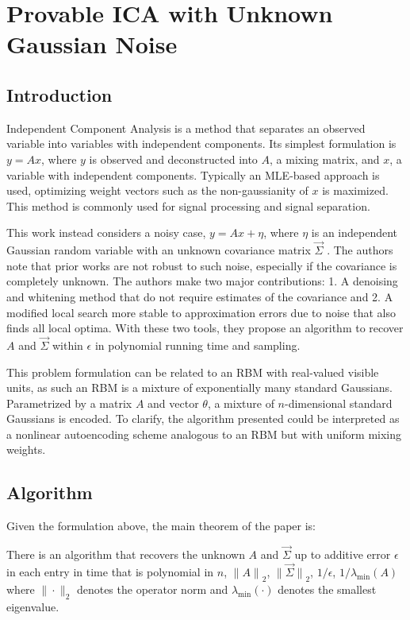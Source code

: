 
\section{Provable ICA with Unknown Gaussian Noise}

\subsection{Introduction}

Independent Component Analysis is a method that separates an observed
variable into variables with independent components. Its simplest
formulation is $y = Ax$, where $y$ is observed and deconstructed into
$A$, a mixing matrix, and $x$, a variable with independent
components. Typically an MLE-based approach is used, optimizing
weight vectors such as the non-gaussianity of $x$ is maximized. This
method is commonly used for signal processing and signal separation.

This work instead considers a noisy case, $y = Ax + \eta$, where
$\eta$ is an independent Gaussian random variable with an unknown
covariance matrix $\vec{\Sigma}$ \cite{arora2012provable}. The
authors note that prior works are not robust to such noise,
especially if the covariance is completely unknown. The authors make
two major contributions: 1. A denoising and whitening method that do
not require estimates of the covariance and 2. A modified local
search more stable to approximation errors due to noise that also
finds all local optima. With these two tools, they propose an
algorithm to recover $A$ and $\vec{\Sigma}$ within $\epsilon$ in
polynomial running time and sampling.

This problem formulation can be related to an RBM with real-valued
visible units, as such an RBM is a mixture of exponentially many
standard Gaussians. Parametrized by a matrix $A$ and vector $\theta$,
a mixture of $n$-dimensional standard Gaussians is encoded. To
clarify, the algorithm presented could be interpreted as a nonlinear
autoencoding scheme analogous to an RBM but with uniform mixing
weights.

\subsection{Algorithm}

Given the formulation above, the main theorem of the paper is:

\begin{theorem}
    There is an algorithm that recovers the unknown $A$ and
    $\vec{\Sigma}$ up to additive error $\epsilon$ in each entry in
    time that is polynomial in $n$, ${\|A\|}_2$,
    ${\|\vec{\Sigma}\|}_2$, $1/{\epsilon}$, $1/{ \lambda_{\min} (A)}$
    where $\| \cdot \|_2$ denotes the operator norm and
    $\lambda_{\min}(\cdot)$ denotes the smallest eigenvalue.
\end{theorem}

